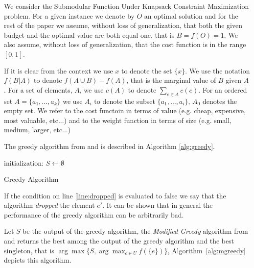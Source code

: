 We consider the Submodular Function Under
Knapsack Constraint Maximization problem.
For a given instance we denote by $O$ an optimal solution and for the rest of the 
paper we assume, without loss of generalization, that both the 
given budget and the optimal value are both equal one, that is $B = f(O) = 1$.
We also assume, without loss of generalization, 
that the cost function is in the range $[0, 1]$.
 
If it is clear from the context we use $x$ to denote the set $\{x\}$. 
We use the notation $f(B|A)$ to denote $f(A \cup B) - f(A)$, that is the marginal value of $B$
given $A$. 
For a set of elements, $A$, we use $c(A)$ to denote $\sum_{e \in A}c(e)$.
For an ordered set $A = \{a_1, \dots, a_k\}$ we use $A_i$ to denote the subset 
$\{a_1, \dots, a_i\}$, $A_0$ denotes the empty set.
We refer to the cost functoin in terms of value (e.g. cheap, expensive, most valuable, etc...) and 
to the weight function in terms of size (e.g. small, medium, larger, etc...) 

The greedy algorithm from \cite{khuller1999budgeted} and \cite{krause2005note}
is described in Algorithm \ref{alg:greedy}.

\begin{algorithm}[H]
\label{alg:greedy}



initialization: $S \leftarrow \emptyset$
\\
\caption{Greedy Algorithm}
\end{algorithm}
 
If the condition on line \ref{line:dropped} is evaluated to false we say that
the algorithm \emph{dropped} the element $e'$.
It can be shown that in general the performance of the greedy algorithm 
can be arbitrarily bad.

Let $S$ be the output of the greedy algorithm, the \emph{Modified Greedy} algorithm 
from \cite{khuller1999budgeted} and \cite{krause2005note} 
returns the best among the output of the greedy algorithm and the best singleton, 
that is $\arg\max\{S, \displaystyle{\arg\max_{e \in U}}f(\{e\})\}$,
Algorithm~\ref{alg:mgreedy} depicts this algorithm.  

